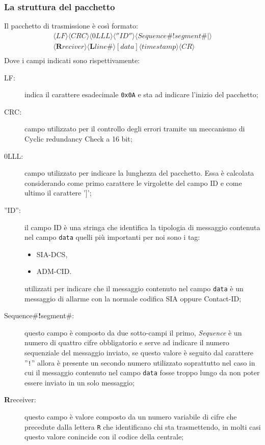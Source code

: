 \subsubsection{La struttura del pacchetto}
Il pacchetto di trasmissione è così formato:
$$
\begin{array}{c}
\langle LF\rangle\langle CRC\rangle\langle 0LLL\rangle\langle ''ID''\rangle\langle Sequence\#\textbf{!}segment\#|\rangle\\\langle\textbf{R}reciver\rangle\langle\textbf{L}line\#\rangle
{[data]}\langle timestamp\rangle \langle CR\rangle\\
\end{array}	 
$$
Dove i campi indicati sono rispettivamente:
\begin{description}
	\item[LF:] indica il carattere esadecimale \texttt{0x0A} e sta ad indicare l'inizio del pacchetto;
	\item[CRC:] campo utilizzato per il controllo degli errori tramite un meccanismo di Cyclic redundancy Check a 16 bit;
	\item[0LLL:] campo utilizzato per indicare la lunghezza del pacchetto. Essa è calcolata considerando come primo carattere le virgolette del campo ID e come ultimo il carattere '$ ] $';
	\item[''ID'':] il campo ID è una stringa che identifica la tipologia di messaggio contenuta nel campo \texttt{data} quelli più importanti per noi sono i tag:
	\begin{itemize}
		\item SIA-DCS,
		\item ADM-CID.
	\end{itemize}
	utilizzati per indicare che il messaggio contenuto nel campo \texttt{data} è un messaggio di allarme con la normale codifica SIA oppure Contact-ID;
	\item[Sequence\#\textbf{!}segment\#:] questo campo è composto da due sotto-campi il primo, \emph{Sequence} è un numero di quattro cifre obbligatorio e serve ad indicare il numero sequenziale del messaggio inviato, se questo valore è seguito dal carattere ''\texttt{!}'' allora è presente un secondo numero utilizzato soprattutto nel caso in cui il messaggio contenuto nel campo \texttt{data} fosse troppo lungo da non poter essere inviato in un solo messaggio;
	\item[\textbf{R}receiver:] questo campo è valore composto da un numero variabile di cifre che precedute dalla lettera \texttt{R} che identificano chi sta trasmettendo, in molti casi questo valore conincide con il codice della centrale;

\end{description}
